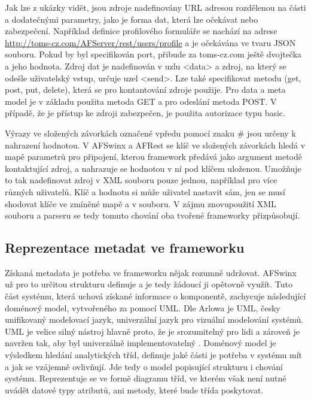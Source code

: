 Jak lze z ukázky vidět, jsou zdroje nadefinovány URL adresou rozdělenou na části a dodatečnými parametry, jako je forma dat, která lze očekávat nebo zabezpečení. Například definice profilového formuláře se nachází na adrese \url{http://toms-cz.com/AFServer/rest/users/profile} a je očekávána ve tvaru JSON souboru. Pokud by byl specifikován port, přibude za toms-cz.com ještě dvojtečka a jeho hodnota. Zdroj dat je nadefinován v uzlu <data> a zdroj, na který se odešle uživatelský vstup, určuje uzel <send>. Lze také specifikovat metodu (get, post, put, delete), která se pro kontantování zdroje použije. Pro data a meta model je v základu použita metoda GET a pro odeslání metoda POST. V případě, že je přístup ke zdroji zabezpečen, je použita autorizace typu basic.

Výrazy ve složených závorkách označené vpředu pomocí znaku \# jsou určeny k nahrazení hodnotou. V AFSwinx a AFRest \cite{tomasek-thesis} se klíč ve složených závorkách hledá v mapě parametrů pro připojení, kterou framework předává jako argument metodě kontaktující zdroj, a nahrazuje se hodnotou v ní pod klíčem uloženou. Umožňuje to tak nadefinovat zdroj v XML souboru pouze jednou, například pro více různých uživatelů. Klíč a hodnotu si může uživatel nastavit sám, jen se musí shodovat klíče ve zmíněné mapě a v souboru. V zájmu znovupoužití XML souboru a parseru se tedy tomuto chování oba tvořené frameworky přizpůsobují.

\subsection{Reprezentace metadat ve frameworku}
Získaná metadata je potřeba ve frameworku nějak rozumně udržovat. AFSwinx už pro to určitou strukturu definuje \cite{tomasek-thesis} a je tedy žádoucí ji opětovně využít. Tuto část systému, která uchová získané informace o komponentě, zachycuje následující doménový model, vytvořeného za pomocí UML. Dle Arlowa je UML, česky unifikovaný modelovací jazyk, univerzální jazyk pro vizuální modelování systémů. UML je velice silný nástroj hlavně proto, že je srozumitelný pro lidi a zároveň je navržen tak, aby byl univerzálně implementovatelný \cite{UmlArlow}. Doménový model je výsledkem hledání analytických tříd, definuje jaké části je potřeba v systému mít a jak se vzájemně ovlivňují. Jde tedy o model popisující strukturu i chování systému. Reprezentuje se ve formě diagramu tříd, ve kterém však není nutné uvádět datové typy atributů, ani metody, které bude třída poskytovat.

